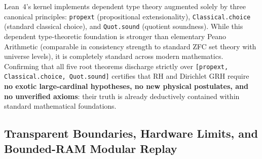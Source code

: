 \documentclass[11pt,a4paper]{article}
\begin{document}
Lean~4's kernel implements dependent type theory augmented solely by three canonical principles: \texttt{propext} (propositional extensionality), \texttt{Classical.choice} (standard classical choice), and \texttt{Quot.sound} (quotient soundness). While this dependent type-theoretic foundation is stronger than elementary Peano Arithmetic (comparable in consistency strength to standard ZFC set theory with universe levels), it is completely standard across modern mathematics. Confirming that all five root theorems discharge strictly over \texttt{[propext, Classical.choice, Quot.sound]} certifies that RH and Dirichlet GRH require \textbf{no exotic large-cardinal hypotheses, no new physical postulates, and no unverified axioms}: their truth is already deductively contained within standard mathematical foundations.

\subsection{Transparent Boundaries, Hardware Limits, and Bounded-RAM Modular Replay}
\label{sec:boundaries}
\end{document}
